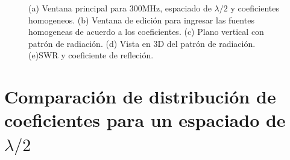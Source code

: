 \documentclass[11pt]{book}
\begin{document}
\begin{figure}[h]
	\caption{(a) Ventana principal para 300MHz, espaciado de $\lambda / 2$ y coeficientes homogeneos. (b) Ventana de edición para ingresar las fuentes homogeneas de acuerdo a los coeficientes. (c) Plano vertical con patrón de radiación. (d) Vista en 3D del patrón de radiación. (e)SWR y coeficiente de refleción.}
\end{figure}
\newpage


\section{Comparación de distribución de coeficientes para un espaciado de $\lambda/2$}
\end{document}
